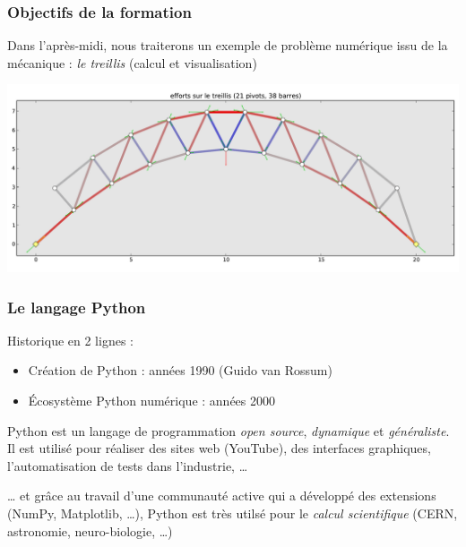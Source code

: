 \documentclass[]{beamer}
\begin{document}
  \begin{frame}
     \frametitle{Objectifs de la formation}

     Dans l'après-midi, nous traiterons un exemple de problème numérique
     issu de la mécanique : \emph{le treillis} (calcul et visualisation)
     
    \begin{center}
     \includegraphics[width=1\textwidth]{treillis_21piv_parabole2.pdf}
    \end{center}
     
  \end{frame}
  
  \begin{frame}
    \frametitle{Le langage Python}
    
    Historique en 2 lignes :
    
    \begin{itemize}
     \item Création de Python : années 1990 (Guido van Rossum)
     \item Écosystème Python numérique : années 2000
    \end{itemize}
    
    \vspace{1em}
    
    Python est un langage de programmation \emph{open source}, \emph{dynamique} et \emph{généraliste}.
    Il est utilisé pour réaliser des sites web (YouTube), des interfaces graphiques,
    l'automatisation de tests dans l'industrie, \dots
    
    \vspace{1em}
    
    \dots{ } et grâce au travail d'une communauté active
    qui a développé des extensions (NumPy, Matplotlib, \dots),
    Python est très utilsé pour
    le \emph{calcul scientifique} (CERN, astronomie, neuro-biologie, \dots)
    
  \end{frame}
\end{document}
